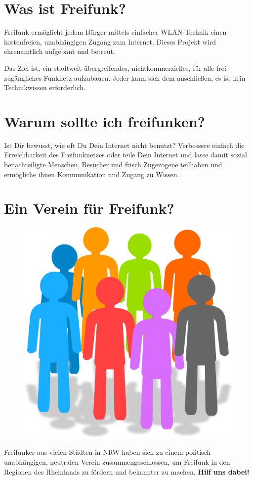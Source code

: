 \documentclass[10pt]{scrartcl}
\begin{document}
\section{\normalsize Was ist Freifunk?}
Freifunk ermöglicht jedem Bürger mittels einfacher WLAN-Technik einen 
kostenfreien, unabhängigen Zugang zum Internet.
Dieses Projekt wird ehrenamtlich aufgebaut und betreut.

Das Ziel ist, ein stadtweit übergreifendes, nichtkommerzielles, für alle frei 
zugängliches Funknetz aufzubauen.
Jeder kann sich dem anschließen, es ist kein Technikwissen erforderlich.

\section{\normalsize Warum sollte ich freifunken?}
Ist Dir bewusst, wie oft Du Dein Internet nicht benutzt? Verbessere einfach die Erreichbarkeit des Freifunknetzes oder teile Dein Internet und lasse damit sozial benachteiligte Menschen, Besucher und frisch Zugezogene teilhaben und ermögliche ihnen Kommunikation und Zugang zu Wissen.

\section{\normalsize Ein Verein für Freifunk?}
\begin{figure}
\includegraphics[scale=0.2]{Verein}
\end{figure}
Freifunker aus vielen Städten in NRW haben sich zu einem politisch unabhängigen, neutralen Verein zusammengeschlossen, um Freifunk in den Regionen des Rheinlands zu fördern und bekannter zu machen.
\textbf{Hilf uns dabei!}
\end{document}
